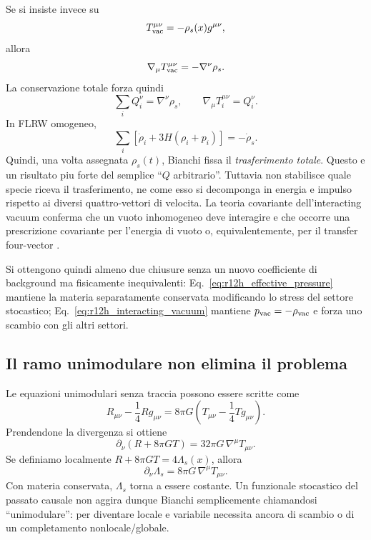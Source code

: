 \documentclass[11pt,a4paper]{article}
\begin{document}
Se si insiste invece su
\begin{equation}
 T_{\rm vac}^{\mu\nu}=-\rho_s(x)g^{\mu\nu},
 \end{equation}
allora
\begin{equation}
 \nabla_\mu T_{\rm vac}^{\mu\nu}=-\nabla^\nu\rho_s.
\end{equation}
La conservazione totale forza quindi
\begin{equation}
 \boxed{
 \sum_i Q_i^{\nu}=\nabla^\nu\rho_s,
 \qquad
 \nabla_\mu T_i^{\mu\nu}=Q_i^{\nu}.
 }
 \label{eq:r12h_interacting_vacuum}
\end{equation}
In FLRW omogeneo,
\begin{equation}
 \boxed{
 \sum_i\left[\dot\rho_i+3H(\rho_i+p_i)\right]
 =-\dot\rho_s.
 }
 \label{eq:r12h_background_exchange}
\end{equation}
Quindi, una volta assegnata $\rho_s(t)$, Bianchi fissa il \emph{trasferimento totale}. Questo e un risultato piu forte del semplice ``$Q$ arbitrario''. Tuttavia non stabilisce quale specie riceva il trasferimento, ne come esso si decomponga in energia e impulso rispetto ai diversi quattro-vettori di velocita. La teoria covariante dell'interacting vacuum conferma che un vuoto inhomogeneo deve interagire e che occorre una prescrizione covariante per l'energia di vuoto o, equivalentemente, per il transfer four-vector \cite{WandsDeSantiagoWang2012}.

Si ottengono quindi almeno due chiusure senza un nuovo coefficiente di background ma fisicamente inequivalenti: Eq.~\eqref{eq:r12h_effective_pressure} mantiene la materia separatamente conservata modificando lo stress del settore stocastico; Eq.~\eqref{eq:r12h_interacting_vacuum} mantiene $p_{\rm vac}=-\rho_{\rm vac}$ e forza uno scambio con gli altri settori.

\subsection{Il ramo unimodulare non elimina il problema}

Le equazioni unimodulari senza traccia possono essere scritte come
\begin{equation}
 R_{\mu\nu}-\frac14Rg_{\mu\nu}
 =8\pi G\left(T_{\mu\nu}-\frac14Tg_{\mu\nu}\right).
\end{equation}
Prendendone la divergenza si ottiene
\begin{equation}
 \partial_\nu(R+8\pi GT)
 =32\pi G\,\nabla^\mu T_{\mu\nu}.
 \label{eq:r12h_unimodular_div}
\end{equation}
Se definiamo localmente $R+8\pi GT=4\Lambda_s(x)$, allora
\begin{equation}
 \boxed{
 \partial_\nu\Lambda_s
 =8\pi G\,\nabla^\mu T_{\mu\nu}.
 }
 \label{eq:r12h_unimodular_same_condition}
\end{equation}
Con materia conservata, $\Lambda_s$ torna a essere costante. Un funzionale stocastico del passato causale non aggira dunque Bianchi semplicemente chiamandosi ``unimodulare'': per diventare locale e variabile necessita ancora di scambio o di un completamento nonlocale/globale.
\end{document}
